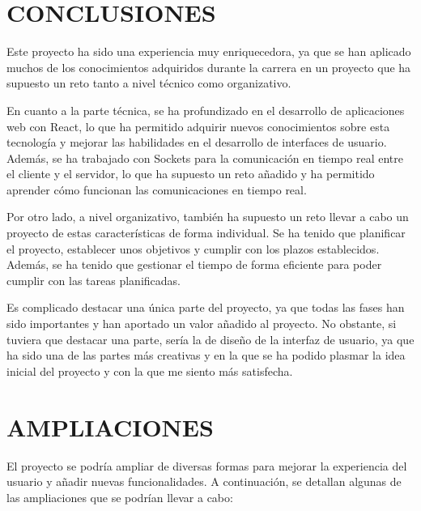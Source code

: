 
\section{CONCLUSIONES}
Este proyecto ha sido una experiencia muy enriquecedora, ya que se han aplicado muchos de los conocimientos adquiridos durante la carrera en un proyecto 
que ha supuesto un reto tanto a nivel técnico como organizativo.

En cuanto a la parte técnica, se ha profundizado en el desarrollo de aplicaciones web con React, lo que ha permitido adquirir nuevos conocimientos
sobre esta tecnología y mejorar las habilidades en el desarrollo de interfaces de usuario. Además, se ha trabajado con Sockets para la comunicación en tiempo real
entre el cliente y el servidor, lo que ha supuesto un reto añadido y ha permitido aprender cómo funcionan las comunicaciones en tiempo real.

Por otro lado, a nivel organizativo, también ha supuesto un reto llevar a cabo un proyecto de estas características de forma individual.
Se ha tenido que planificar el proyecto, establecer unos objetivos y cumplir con los plazos establecidos. Además, se ha tenido que gestionar el tiempo
de forma eficiente para poder cumplir con las tareas planificadas.


Es complicado destacar una única parte del proyecto, ya que todas las fases han sido importantes y han aportado un valor añadido al proyecto.
No obstante, si tuviera que destacar una parte, sería la de diseño de la interfaz de usuario, ya que ha sido una de las partes más creativas y en la que
se ha podido plasmar la idea inicial del proyecto y con la que me siento más satisfecha.


\newpage
\section{AMPLIACIONES} 
El proyecto se podría ampliar de diversas formas para mejorar la experiencia del usuario y añadir nuevas funcionalidades.
A continuación, se detallan algunas de las ampliaciones que se podrían llevar a cabo:

